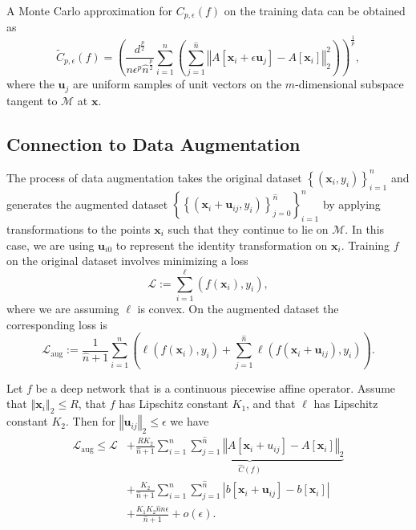 A Monte Carlo approximation for $C_{p,\epsilon}(f)$ on the training data can be obtained as 
\begin{equation}\label{eq:monte_carlo_rugosity_cpa}
    \tilde{C}_{p,\epsilon}(f)=\left(\frac{d^{\frac{p}{2}}}{n\epsilon^p\hat{n}^{\frac{p}{2}}}\sum_{i=1}^n\left(\sum_{j=1}^{\hat{n}}\left\Vert A\left[\mathbf{x}_i+\epsilon\mathbf{u}_j\right]-A\left[\mathbf{x}_i\right]\right\Vert_2^2\right)\right)^{\frac{1}{p}},
\end{equation}
where the $\mathbf{u}_j$ are uniform samples of unit vectors on the $m$-dimensional subspace tangent to $\mathcal{M}$ at $\mathbf{x}$.

\subsection{Connection to Data Augmentation}

The process of data augmentation takes the original dataset $\left\{\left(\mathbf{x}_i,y_i\right)\right\}_{i=1}^n$ and generates the augmented dataset $\left\{\left\{\left(\mathbf{x}_i+\mathbf{u}_{ij},y_i\right)\right\}_{j=0}^{\hat{n}}\right\}_{i=1}^n$ by applying transformations to the points $\mathbf{x}_i$ such that they continue to lie on $\mathcal{M}$. In this case, we are using $\mathbf{u}_{i0}$ to represent the identity transformation on $\mathbf{x}_i$. Training $f$ on the original dataset involves minimizing a loss $$\mathcal{L}:=\sum_{i=1}^\ell\left(f\left(\mathbf{x}_i\right),y_i\right),$$where we are assuming $\ell$ is convex. On the augmented dataset the corresponding loss is $$\mathcal{L}_{\text{aug}}:=\frac{1}{\hat{n}+1}\sum_{i=1}^n\left(\ell\left(f\left(\mathbf{x}_i\right),y_i\right)+\sum_{j=1}^{\hat{n}}\ell\left(f\left(\mathbf{x}_i+\mathbf{u}_{ij}\right),y_i\right)\right).$$

\begin{theorem}
    Let $f$ be a deep network that is a continuous piecewise affine operator. Assume that $\left\Vert\mathbf{x}_i\right\Vert_2\leq R$, that $f$ has Lipschitz constant $K_1$, and that $\ell$ has Lipschitz constant $K_2$. Then for $\left\Vert\mathbf{u}_{ij}\right\Vert_2\leq\epsilon$ we have 
    \begin{align}
        \mathcal{L}_{\text{aug}}\leq\mathcal{L}&+\frac{RK_2}{\hat{n}+1}\underbrace{\sum_{i=1}^n\sum_{j=1}^{\hat{n}}\left\Vert A\left[\mathbf{x}_i+u_{ij}\right]-A\left[\mathbf{x}_i\right]\right\Vert_2}_{\hat{C}(f)}\nonumber\\&+\frac{K_2}{\hat{n}+1}\sum_{i=1}^n\sum_{j=1}^{\hat{n}}\left\vert b\left[\mathbf{x}_i+\mathbf{u}_{ij}\right]-b\left[\mathbf{x}_i\right]\right\vert\nonumber\\&+\frac{K_1K_2\hat{n}n\epsilon}{\hat{n}+1}+o(\epsilon).
    \end{align}
\end{theorem}

